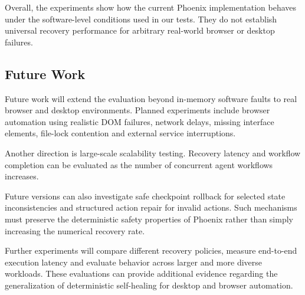 \documentclass[conference]{IEEEtran}
\begin{document}
Overall, the experiments show how the current Phoenix implementation behaves under the software-level conditions used in our tests. They do not establish universal recovery performance for arbitrary real-world browser or desktop failures.

\subsection{Future Work}
Future work will extend the evaluation beyond in-memory software faults to real browser and desktop environments. Planned experiments include browser automation using realistic DOM failures, network delays, missing interface elements, file-lock contention and external service interruptions.

Another direction is large-scale scalability testing. Recovery latency and workflow completion can be evaluated as the number of concurrent agent workflows increases.

Future versions can also investigate safe checkpoint rollback for selected state inconsistencies and structured action repair for invalid actions. Such mechanisms must preserve the deterministic safety properties of Phoenix rather than simply increasing the numerical recovery rate.

Further experiments will compare different recovery policies, measure end-to-end execution latency and evaluate behavior across larger and more diverse workloads. These evaluations can provide additional evidence regarding the generalization of deterministic self-healing for desktop and browser automation.
\end{document}
